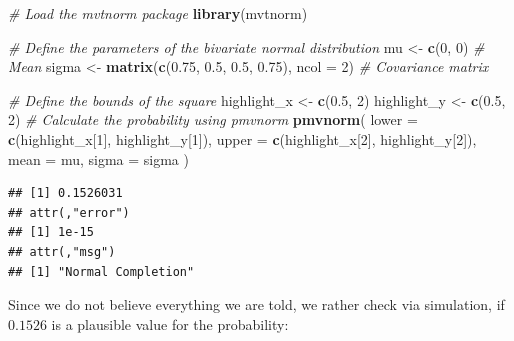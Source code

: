 \documentclass[
]{book}
\newenvironment{Shaded}{\begin{snugshade}}{\end{snugshade}}
\newcommand{\AttributeTok}[1]{\textcolor[rgb]{0.13,0.29,0.53}{#1}}
\newcommand{\CommentTok}[1]{\textcolor[rgb]{0.56,0.35,0.01}{\textit{#1}}}
\newcommand{\DecValTok}[1]{\textcolor[rgb]{0.00,0.00,0.81}{#1}}
\newcommand{\FloatTok}[1]{\textcolor[rgb]{0.00,0.00,0.81}{#1}}
\newcommand{\FunctionTok}[1]{\textcolor[rgb]{0.13,0.29,0.53}{\textbf{#1}}}
\newcommand{\NormalTok}[1]{#1}
\newcommand{\OtherTok}[1]{\textcolor[rgb]{0.56,0.35,0.01}{#1}}
\begin{document}
\begin{Shaded}
\begin{Highlighting}[]
\CommentTok{\# Load the mvtnorm package}
\FunctionTok{library}\NormalTok{(mvtnorm)}

\CommentTok{\# Define the parameters of the bivariate normal distribution}
\NormalTok{mu }\OtherTok{\textless{}{-}} \FunctionTok{c}\NormalTok{(}\DecValTok{0}\NormalTok{, }\DecValTok{0}\NormalTok{)                       }\CommentTok{\# Mean}
\NormalTok{sigma }\OtherTok{\textless{}{-}} \FunctionTok{matrix}\NormalTok{(}\FunctionTok{c}\NormalTok{(}\FloatTok{0.75}\NormalTok{, }\FloatTok{0.5}\NormalTok{, }\FloatTok{0.5}\NormalTok{, }\FloatTok{0.75}\NormalTok{), }\AttributeTok{ncol =} \DecValTok{2}\NormalTok{) }\CommentTok{\# Covariance matrix}

\CommentTok{\# Define the bounds of the square}
\NormalTok{highlight\_x }\OtherTok{\textless{}{-}} \FunctionTok{c}\NormalTok{(}\FloatTok{0.5}\NormalTok{, }\DecValTok{2}\NormalTok{)}
\NormalTok{highlight\_y }\OtherTok{\textless{}{-}} \FunctionTok{c}\NormalTok{(}\FloatTok{0.5}\NormalTok{, }\DecValTok{2}\NormalTok{)}
\CommentTok{\# Calculate the probability using pmvnorm}
\FunctionTok{pmvnorm}\NormalTok{(}
  \AttributeTok{lower =} \FunctionTok{c}\NormalTok{(highlight\_x[}\DecValTok{1}\NormalTok{], highlight\_y[}\DecValTok{1}\NormalTok{]),}
  \AttributeTok{upper =} \FunctionTok{c}\NormalTok{(highlight\_x[}\DecValTok{2}\NormalTok{], highlight\_y[}\DecValTok{2}\NormalTok{]),}
  \AttributeTok{mean =}\NormalTok{ mu,}
  \AttributeTok{sigma =}\NormalTok{ sigma}
\NormalTok{)}
\end{Highlighting}
\end{Shaded}

\begin{verbatim}
## [1] 0.1526031
## attr(,"error")
## [1] 1e-15
## attr(,"msg")
## [1] "Normal Completion"
\end{verbatim}

Since we do not believe everything we are told, we rather check via simulation,
if \(0.1526\) is a plausible value for the probability:
\end{document}
